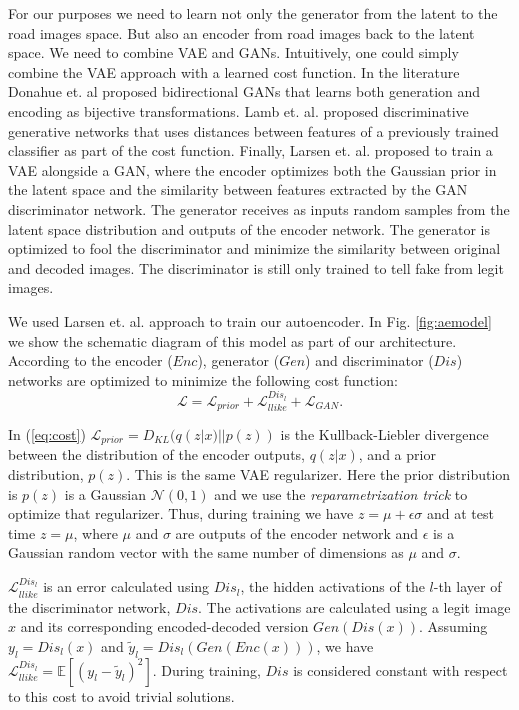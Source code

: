 \documentclass{article} %
\begin{document}
For our purposes we need to learn not only the generator from the latent to the road images space. But also an encoder from road images
back to the latent space. We need to combine VAE and GANs. Intuitively, one could simply combine the VAE approach with a learned cost function.
In the literature Donahue et. al \cite{bigan} proposed bidirectional GANs that learns
both generation and encoding as bijective transformations. Lamb et. al. \cite{disgan} proposed discriminative generative networks that uses distances between
features of a previously trained classifier as part of the cost function. Finally, Larsen et. al. \cite{aegan} proposed to train a VAE alongside a GAN,
where the encoder optimizes both the Gaussian prior in the latent space and the similarity between features extracted by the GAN discriminator network.
The generator receives as inputs random samples from the latent space distribution and outputs of the encoder network. The generator is optimized to fool
the discriminator and minimize the similarity between original and decoded images. The discriminator is still only trained to tell fake from legit images.

We used Larsen et. al. \cite{aegan} approach to train our autoencoder. In Fig. \ref{fig:aemodel} we show the schematic diagram of this model as part of our architecture.
According to \cite{aegan} the encoder ($Enc$), generator ($Gen$) and discriminator ($Dis$) networks are optimized to minimize the following cost function:
\begin{equation}
 \label{eq:cost}
 \mathcal{L} = \mathcal{L}_{prior} + \mathcal{L}_{llike}^{Dis_l} + \mathcal{L}_{GAN}.
\end{equation}

In (\ref{eq:cost}) $\mathcal{L}_{prior} = D_{KL}(q(z|x)||p(z))$ is the Kullback-Liebler divergence between the distribution of the encoder outputs, $q(z|x)$,
and a prior distribution, $p(z)$.
This is the same VAE regularizer. Here the prior distribution is $p(z)$ is a Gaussian $\mathcal{N}(0, 1)$ and we use the \textit{reparametrization trick} \cite{VAE}
to optimize that regularizer. Thus, during training we have $z = \mu + \epsilon \sigma$ and at test time $z = \mu$, where $\mu$ and $\sigma$ are outputs
of the encoder network and $\epsilon$ is a Gaussian random vector with the same number of dimensions as $\mu$ and $\sigma$.

$\mathcal{L}_{llike}^{Dis_l}$ is an error calculated using $Dis_l$, the hidden activations of the $l$-th layer of the discriminator network, $Dis$.
The activations are calculated using a legit image $x$ and its corresponding encoded-decoded version $Gen(Dis(x))$. Assuming $y_l = Dis_l(x)$ and
$\tilde{y}_l = Dis_l(Gen(Enc(x)))$, we have $\mathcal{L}_{llike}^{Dis_l} = \mathbb{E}\left[ (y_l - \tilde{y}_l)^2 \right]$. During training, $Dis$
is considered constant with respect to this cost to avoid trivial solutions.
\end{document}
